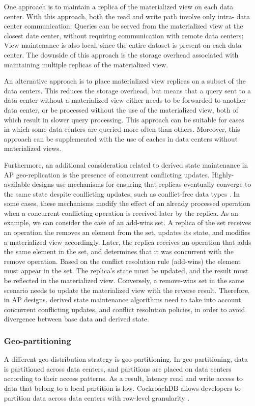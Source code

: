One approach is to maintain a replica of the materialized view on each data center.
With this approach, both the read and write path involve only intra- data center communication:
Queries can be served from the materialized view at the closest date center, without requiring communication with
remote data centers;
View maintenance is also local, since the entire dataset is present on each data center.
The downside of this approach is the storage overhead associated with maintaining multiple replicas of the materialized
view.

An alternative approach is to place materialized view replicas on a subset of the data centers.
This reduces the storage overhead, but means that a query sent to a data center without a materialized view
either needs to be forwarded to another data center, or be processed without the use of the materialized view,
both of which result in slower query processing.
This approach can be suitable for cases in which some data centers are queried more often than others.
Moreover, this approach can be supplemented with the use of caches in data centers without materialized
views.

Furthermore, an additional consideration related to derived state maintenance in AP geo-replication
is the presence of concurrent conflicting updates.
Highly-available designs use mechanisms for ensuring that replicas eventually converge to the same state despite
conflicting updates, such as conflict-free data types \cite{Shapiro2011CRDTs}.
In some cases, these mechanisms modify the effect of an already processed operation when a concurrent conflicting operation
is received later by the replica.
As an example, we can consider the case of an add-wins set.
A replica of the set receives an operation the removes an element from the set, updates its state,
and modifies a materialized view accordingly.
Later, the replica receives an operation that adds the same element in the set, and determines that it was concurrent with the
remove operation.
Based on the conflict resolution rule (add-wins) the element must appear in the set.
The replica's state must be updated, and the result must be reflected in the materialized view.
Conversely, a remove-wins set in the same scenario needs to update the materialized view with the reverse result.
Therefore, in AP designs, derived state maintenance algorithms need to take into account concurrent conflicting updates,
and conflict resolution policies, in order to avoid divergence between base data and derived state.

\subsubsection{Geo-partitioning}
A different geo-distribution strategy is geo-partitioning.
In geo-partitioning, data is partitioned across data centers, and partitions are placed on data centers according to
their access patterns.
As a result, latency read and write access to data that belong to a local partition is low.
CockroachDB allows developers to partition data across data centers with row-level granularity
\cite{cockroachdb:geopartitioning}.

